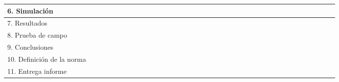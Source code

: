 \begin{table}[htbp]
{\begin{tabular}{|lr|r|r|r|r|r|r|r|r|r|r|r|r|r|r|r|r|r|r|r|r|r|r|r|r|r|r|r|r|r|r|r|r|r|r|r|r|}
    \hline
    \multicolumn{2}{|l|}{6. Simulaci\'{o}n} &       &       &       &       &       &       &       &       &       &       &       &       &       &       &       &       &       &       &       &       &       &       &       &       &       &       &       &       &       &       &       &       & \cellcolor[rgb]{ .357,  .608,  .835} & \cellcolor[rgb]{ .357,  .608,  .835} & \cellcolor[rgb]{ .357,  .608,  .835} & \cellcolor[rgb]{ .357,  .608,  .835} \\
    \hline
    \multicolumn{2}{|l|}{7. Resultados} &       &       &       &       &       &       &       &       &       &       &       &       &       &       &       &       &       &       &       &       &       &       &       &       &       &       &       &       &       &       &       &       &       &       &       &  \\
    \hline
    \multicolumn{2}{|l|}{8. Prueba de campo} &       &       &       &       &       &       &       &       &       &       &       &       &       &       &       &       &       &       &       &       &       &       &       &       &       &       &       &       &       &       &       &       &       &       &       &  \\
    \hline
    \multicolumn{2}{|l|}{9. Conclusiones} &       &       &       &       &       &       &       &       &       &       &       &       &       &       &       &       &       &       &       &       &       &       &       &       &       &       &       &       &       &       &       &       &       &       &       &  \\
    \hline
    \multicolumn{2}{|l|}{10. Definici\'{o}n de la norma} &       &       &       &       &       &       &       &       &       &       &       &       &       &       &       &       &       &       &       &       &       &       &       &       &       &       &       &       &       &       &       &       &       &       &       &  \\
    \hline
    \multicolumn{2}{|l|}{11. Entrega informe} &       &       &       &       &       &       &       &       &       &       &       &       &       &       &       &       &       &       &       &       &       &       &       &       &       &       &       &       &       &       &       &       &       &       &       &  \\
    \hline

\end{tabular}}
\end{table}
